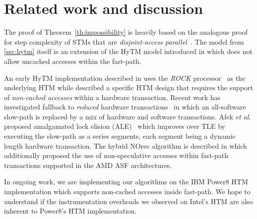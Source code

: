 \section{Related work and discussion}
\label{sec:rel}
%
The proof of Theorem~\ref{th:impossibility} is heavily based on the analogous proof for step complexity of
STMs that are \emph{disjoint-access parallel}~\cite{prog15-pact}.
The model from \cref{sec:hytm} itself is an extension of the HyTM model introduced in \cite{hytm14disc}
which does not allow uncached accesses within the fast-path.

An early HyTM implementation described in \cite{damronhytm} uses the \emph{ROCK} processor~\cite{rock} as the underlying HTM
while \cite{kumarhytm} described a specific HTM design that requires the support of \emph{non-cached accesses}
within a hardware transaction. 
Recent work has investigated fallback to \emph{reduced} hardware transactions~\cite{MS13}
in which an all-software slow-path is replaced by a mix of hardware and software transactions. 
Afek \emph{et al}. proposed amalgamated lock elision (ALE)~\cite{ale15} which improves over TLE
by executing the slow-path as a series segments, each segment being a dynamic length hardware transaction.
The hybrid NOrec algorithm is described in \cite{hynorecriegel} which additionally proposed the use of non-speculative accesses
within fast-path transactions supported in the AMD ASF architectures.

In ongoing work, we are implementing our algorithms on the IBM Power8 HTM implementation which supports
non-cached accesses inside fast-path. We hope to understand if the instrumentation overheads we observed
on Intel's HTM are also inherent to Power8's HTM implementation.